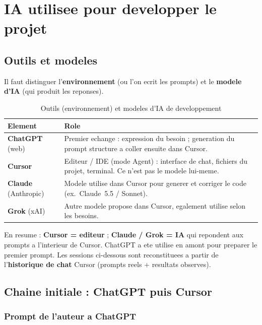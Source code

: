\chapter{IA utilisee pour developper le projet}
\label{ch:dev}

\section{Outils et modeles}

Il faut distinguer l'\textbf{environnement} (ou l'on ecrit les prompts) et le
\textbf{modele d'IA} (qui produit les reponses).

\begin{table}[H]
\centering
\begin{tabular}{@{}p{3.5cm}p{9.5cm}@{}}
\toprule
Element & Role \\
\midrule
\textbf{ChatGPT} (web) &
Premier echange : expression du besoin ; generation du prompt structure
a coller ensuite dans Cursor. \\
\textbf{Cursor} &
Editeur / IDE (mode Agent) : interface de chat, fichiers du projet, terminal.
Ce n'est pas le modele lui-meme. \\
\textbf{Claude} (Anthropic) &
Modele utilise dans Cursor pour generer et corriger le code
(ex.\ Claude~5.5 / Sonnet). \\
\textbf{Grok} (xAI) &
Autre modele propose dans Cursor, egalement utilise selon les besoins. \\
\bottomrule
\end{tabular}
\caption{Outils (environnement) et modeles d'IA de developpement}
\end{table}

En resume : \textbf{Cursor = editeur} ; \textbf{Claude / Grok = IA} qui repondent
aux prompts a l'interieur de Cursor. ChatGPT a ete utilise en amont pour preparer
le premier prompt. Les sessions ci-dessous sont reconstituees a partir de
l'\textbf{historique de chat} Cursor (prompts reels + resultats observes).

\section{Chaine initiale : ChatGPT puis Cursor}
\label{sec:chatgpt-cursor}

\subsection{Prompt de l'auteur a ChatGPT}

